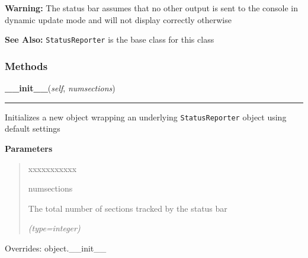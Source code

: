 \textbf{Warning:} The status bar assumes that no other output is sent to the console in 
dynamic update mode and will not display correctly otherwise



\textbf{See Also:} \texttt{StatusReporter} is the base class for this class





  \subsubsection{Methods}

    \vspace{0.5ex}

\hspace{.8\funcindent}\begin{boxedminipage}{\funcwidth}

    \raggedright \textbf{\_\_init\_\_}(\textit{self}, \textit{numsections})

    \vspace{-1.5ex}

    \rule{\textwidth}{0.5\fboxrule}
\setlength{\parskip}{2ex}
    Initializes a new object wrapping an underlying \texttt{StatusReporter}
    object using default settings

\setlength{\parskip}{1ex}
      \textbf{Parameters}
      \vspace{-1ex}

      \begin{quote}
        \begin{Ventry}{xxxxxxxxxxx}

          \item[numsections]

          The total number of sections tracked by the status bar

            {\it (type=integer)}

        \end{Ventry}

      \end{quote}

      Overrides: object.\_\_init\_\_

    \end{boxedminipage}

